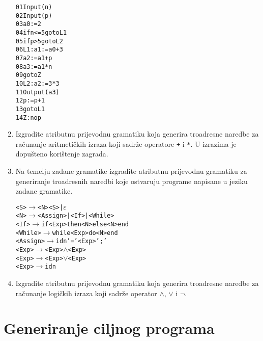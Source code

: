 \documentclass[times, 12pt, utf8]{book}
\begin{document}
\begin{enumerate}[resume]
\begin{alltt}
01      Input(n)
02      Input(p)
03      a0 := 2
04      if n <= 5 goto L1
05      if p > 5 goto L2
06  L1: a1 := a0 + 3
07      a2 := a1 + p
08      a3 := a1 * n
09      goto Z
10  L2: a2 := 3 * 3
11      Output (a3)
12      p := p + 1
13      goto L1
14  Z:  nop
\end{alltt} 

\item
Izgradite atributnu prijevodnu gramatiku koja generira troadresne naredbe za računanje aritmetičkih izraza koji sadrže operatore \texttt{+} i \texttt{*}.
U izrazima je dopušteno korištenje zagrada. \cite[str.~178-180]{udzbenik} \cite{auditorne}

\item
Na temelju zadane gramatike izgradite atributnu prijevodnu gramatiku za generiranje troadresnih naredbi koje ostvaruju programe napisane u jeziku zadane gramatike. \cite[str.~178-180]{udzbenik}

\begin{alltt}
<S> \(\to\) <N> <S> | \(\varepsilon\)
<N> \(\to\) <Assign> | <If> | <While>
<If> \(\to\) if <Exp> then <N> else <N> end
<While> \(\to\) while <Exp> do <N> end
<Assign> \(\to\) idn '=' <Exp> ';'
<Exp> \(\to\) <Exp> \( \wedge \) <Exp>
<Exp> \(\to\) <Exp> \( \vee \) <Exp>
<Exp> \(\to\) idn
\end{alltt} 

\item
Izgradite atributnu prijevodnu gramatiku koja generira troadresne naredbe za računanje logičkih izraza koji sadrže operator \(\wedge\), \(\vee\) i \(\lnot\). \cite[str.~178-180]{udzbenik}

\end{enumerate}


\chapter{Generiranje ciljnog programa}

\end{document}

